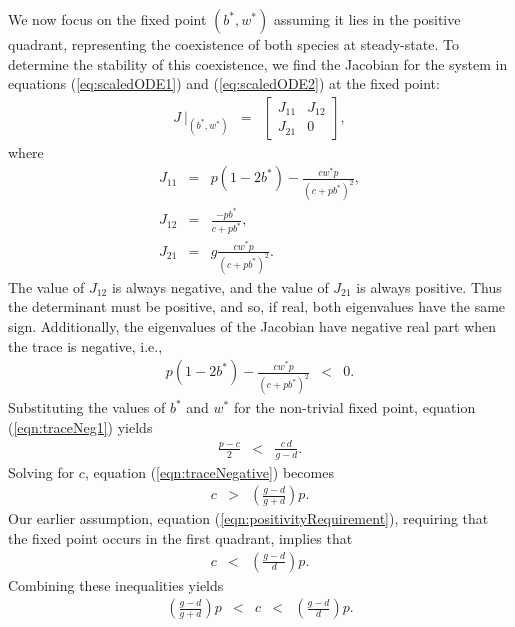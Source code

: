 \documentclass[review,authoryear]{elsarticle}
\begin{document}
We now focus on the fixed point $(b^*,w^*)$ assuming it lies in the positive quadrant, representing the coexistence of both species at steady-state. To determine the stability of this coexistence, we find the Jacobian for the system in equations (\ref{eq:scaledODE1}) and
(\ref{eq:scaledODE2}) at the fixed point:
\begin{eqnarray}
  J ~ \bigg|_{(b^*,w^*)} & = &
          \left[
          \begin{array}{rr}
            J_{11} & J_{12} \\
            J_{21} & 0
          \end{array}
          \right],
\end{eqnarray}
where
\begin{eqnarray}
  \label{eq:jacobian}
  J_{11} & = & p (1-2b^*) -  \frac{cw^*p}{(c+p b^*)^2}, \\
  J_{12} & = & \frac{-pb^* }{c+p b^*}, \\
  J_{21} & = &g\frac{ c  w^*  p}{(c+p b^*)^2}.
\end{eqnarray}
The value of $J_{12}$ is always negative, and the value of $J_{21}$ is always positive. Thus the determinant must be positive, and so, if real, both eigenvalues have the same sign.
Additionally, the eigenvalues of the Jacobian have negative real part when the
trace is negative, i.e.,
\begin{eqnarray}
\label{eqn:traceNeg1}
  p (1-2b^*) - \frac{cw^*p}{(c+p b^*)^2} & < & 0.
\end{eqnarray}
Substituting the values of $b^*$ and $w^*$ for the non-trivial fixed point, equation (\ref{eqn:traceNeg1})
yields
\begin{eqnarray}
  \label{eqn:traceNegative}
  \frac{p-c}{2} & < & \frac{c\,d}{g-d}.
\end{eqnarray}
Solving for $c$,   equation
(\ref{eqn:traceNegative}) becomes
\begin{eqnarray}
  \label{eq:stabilityParameters}
  c & > &\left( \frac{g-d}{g+d}\right)p.
\end{eqnarray}
 Our earlier assumption, equation (\ref{eqn:positivityRequirement}), requiring that the fixed point occurs in the first quadrant,  implies that
\begin{eqnarray}
  \label{eq:boundFixedPoint}
  c & < & \left(\frac{g-d}{d}\right)p.
\end{eqnarray}
Combining these inequalities yields
\begin{equation}
  \begin{array}{rcccl}
  \left( \frac{g-d}{g+d}\right)p  & <  & c  & < & \left( \frac{g-d}{d}\right)p.
  \end{array}
\end{equation}
\end{document}
